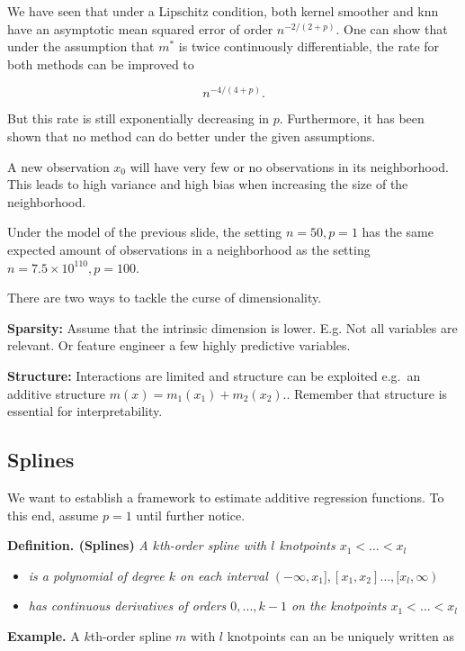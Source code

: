 \documentclass[
]{book}
\providecommand{\tightlist}{%
  \setlength{\itemsep}{0pt}\setlength{\parskip}{0pt}}
\begin{document}
We have seen that under a Lipschitz condition, both kernel smoother and knn have an asymptotic mean squared error of order \(n^{-2/(2+p)}\). One can show that under the assumption that \(m^\ast\) is twice continuously differentiable, the rate for both methods can be improved to

\[
n^{-4/(4+p)}.
\]

But this rate is still exponentially decreasing in \(p\). Furthermore, it has been shown that no method can do better under the given assumptions.

A new observation \(x_0\) will have very few or no observations in its neighborhood. This leads to high variance and high bias when increasing the size of the neighborhood.

Under the model of the previous slide, the setting \(n=50,p=1\) has the same expected amount of observations in a neighborhood as the setting \(n=7.5\times10^{110}, p=100\).

There are two ways to tackle the curse of dimensionality.

\textbf{Sparsity:} Assume that the intrinsic dimension is lower. E.g. Not all variables are relevant. Or feature engineer a few highly predictive variables.

\textbf{Structure:} Interactions are limited and structure can be exploited
e.g.~an additive structure \(m(x)=m_1(x_1)+m_2(x_2).\). Remember that structure is essential for interpretability.

\hypertarget{splines}{%
\subsection{Splines}\label{splines}}

We want to establish a framework to estimate additive regression functions. To this end, assume \(p=1\) until further notice.

\textbf{Definition. (Splines)} \emph{A \(k\)th-order spline with \(l\) knotpoints \(x_1 <\dots<x_l\)}

\begin{itemize}
\tightlist
\item
  \emph{is a polynomial of degree \(k\) on each interval \((-\infty,x_1],[x_1,x_2]\dots,[x_l,\infty)\)}
\item
  \emph{has continuous derivatives of orders \(0,...,k-1\) on the knotpoints \(x_1 <\dots<x_l\)}
\end{itemize}

\textbf{Example.} A \(k\)th-order spline \(m\) with \(l\) knotpoints can an be uniquely written as
\end{document}
